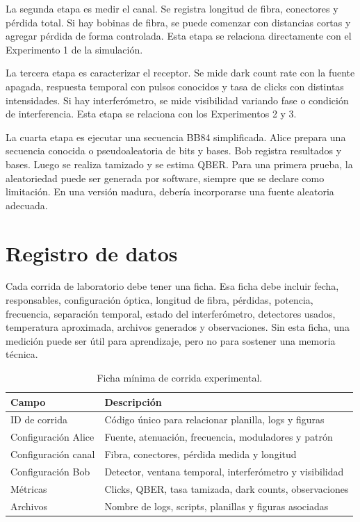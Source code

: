 La segunda etapa es medir el canal. Se registra longitud de fibra, conectores y pérdida total. Si hay bobinas de fibra, se puede comenzar con distancias cortas y agregar pérdida de forma controlada. Esta etapa se relaciona directamente con el Experimento 1 de la simulación.

La tercera etapa es caracterizar el receptor. Se mide dark count rate con la fuente apagada, respuesta temporal con pulsos conocidos y tasa de clicks con distintas intensidades. Si hay interferómetro, se mide visibilidad variando fase o condición de interferencia. Esta etapa se relaciona con los Experimentos 2 y 3.

La cuarta etapa es ejecutar una secuencia BB84 simplificada. Alice prepara una secuencia conocida o pseudoaleatoria de bits y bases. Bob registra resultados y bases. Luego se realiza tamizado y se estima QBER. Para una primera prueba, la aleatoriedad puede ser generada por software, siempre que se declare como limitación. En una versión madura, debería incorporarse una fuente aleatoria adecuada.

\section{Registro de datos}

Cada corrida de laboratorio debe tener una ficha. Esa ficha debe incluir fecha, responsables, configuración óptica, longitud de fibra, pérdidas, potencia, frecuencia, separación temporal, estado del interferómetro, detectores usados, temperatura aproximada, archivos generados y observaciones. Sin esta ficha, una medición puede ser útil para aprendizaje, pero no para sostener una memoria técnica.

\begin{table}[H]
  \centering
  \begin{tabularx}{\textwidth}{p{}X}
    \toprule
    Campo & Descripción \\
    \midrule
    ID de corrida & Código único para relacionar planilla, logs y figuras \\
    Configuración Alice & Fuente, atenuación, frecuencia, moduladores y patrón \\
    Configuración canal & Fibra, conectores, pérdida medida y longitud \\
    Configuración Bob & Detector, ventana temporal, interferómetro y visibilidad \\
    Métricas & Clicks, QBER, tasa tamizada, dark counts, observaciones \\
    Archivos & Nombre de logs, scripts, planillas y figuras asociadas \\
    \bottomrule
  \end{tabularx}
  \caption{Ficha mínima de corrida experimental.}
  \label{tab:ficha_corrida}
\end{table}

